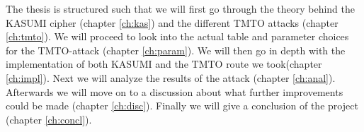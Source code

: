 The thesis is structured such that we will first go through the theory
behind the KASUMI cipher (chapter \ref{ch:kas}) and the different TMTO
attacks (chapter \ref{ch:tmto}). We will proceed to look into the
actual table and parameter choices for the TMTO-attack (chapter
\ref{ch:param}). We will then go in depth with the
implementation of both KASUMI and the TMTO route we took(chapter
\ref{ch:impl}). Next we will analyze the results of the attack
(chapter \ref{ch:anal}). Afterwards we will move on to a discussion
about what further improvements could be made (chapter
\ref{ch:disc}). Finally we will give a conclusion of the project
(chapter \ref{ch:concl}).

